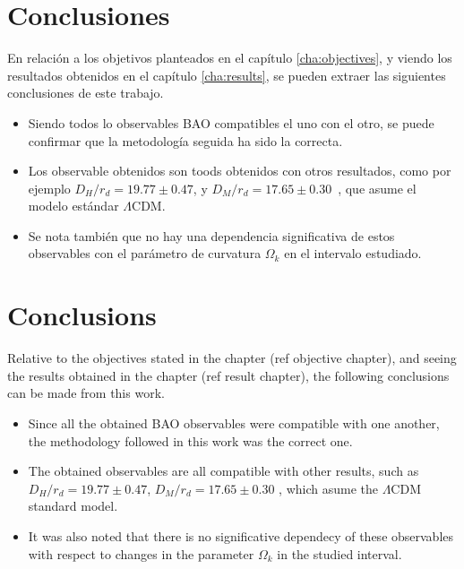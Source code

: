 \chapter*{Conclusiones}

En relación a los objetivos planteados en el capítulo \ref{cha:objectives}, y viendo los resultados obtenidos en el capítulo \ref{cha:results}, se pueden extraer las siguientes conclusiones de este trabajo.
\begin{itemize}
	\item Siendo todos lo observables BAO compatibles el uno con el otro, se puede confirmar que la metodología seguida ha sido la correcta.
	\item Los observable obtenidos son toods obtenidos con otros resultados, como por ejemplo $D_H/r_d   = 19.77\pm 0.47$, y $D_M /r_d   = 17.65\pm 0.30$~\cite{Gil_Mar_n_2020}, que asume el modelo estándar $\Lambda$CDM.
	\item Se nota también que no hay una dependencia significativa de estos observables con el parámetro de curvatura $\Omega_k$ en el intervalo estudiado. 
\end{itemize}


\chapter*{Conclusions}

Relative to the objectives stated in the chapter (ref objective chapter), and seeing the results obtained in the chapter (ref result chapter), the following conclusions can be made from this work.

\begin{itemize}
	\item Since all the obtained BAO observables were compatible with one another, the methodology followed in this work was the correct one. 
	\item The obtained observables are all compatible with other results, such as $D_H/r_d =19.77\pm 0.47$, $D_M /r_d=17.65\pm 0.30$ \cite{Gil_Mar_n_2020}, which asume the $\Lambda$CDM standard model.
	\item It was also noted that there is no significative dependecy of these observables with respect to changes in the parameter $\Omega_k$ in the studied interval.
\end{itemize}

